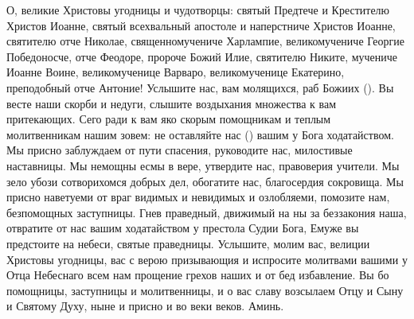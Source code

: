 \begin{mymulticols}

О, великие Христовы угодницы и чудотворцы: святый Предтече и Крестителю Христов Иоанне, святый всехвальный апостоле и наперстниче Христов Иоанне, святителю отче Николае, священномучениче Харлампие, великомучениче Георгие Победоносче, отче Феодоре, пророче Божий Илие, святителю Никите, мучениче Иоанне Воине, великомученице Варваро, великомученице Екатерино, преподобный отче Антоние! Услышите нас, вам молящихся, раб Божиих (). Вы весте наши скорби и недуги, слышите воздыхания множества к вам притекающих. Сего ради к вам яко скорым помощникам и теплым молитвенникам нашим зовем: не оставляйте нас () вашим у Бога ходатайством. Мы присно заблуждаем от пути спасения, руководите нас, милостивые наставницы. Мы немощны есмы в вере, утвердите нас, правоверия учители. Мы зело убози сотворихомся добрых дел, обогатите нас, благосердия сокровища. Мы присно наветуеми от враг видимых и невидимых и озлобляеми, помозите нам, безпомощных заступницы. Гнев праведный, движимый на ны за беззакония наша, отвратите от нас вашим ходатайством у престола Судии Бога, Емуже вы предстоите на небеси, святые праведницы. Услышите, молим вас, велиции Христовы угодницы, вас с верою призывающия и испросите молитвами вашими у Отца Небеснаго всем нам прощение грехов наших и от бед избавление. Вы бо помощницы, заступницы и молитвенницы, и о вас славу возсылаем Отцу и Сыну и Святому Духу, ныне и присно и во веки веков. Аминь.


\end{mymulticols}

